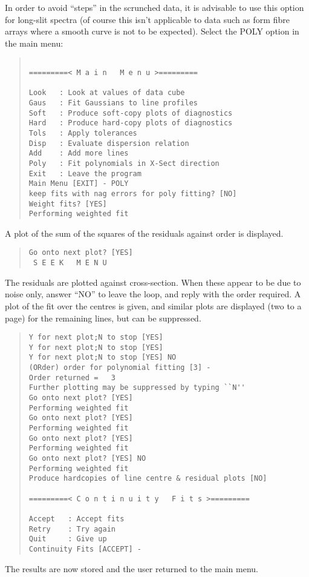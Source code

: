 In order to avoid ``steps'' in the scrunched data, it is advisable to
use this option for long-slit spectra (of course this isn't applicable
to data such as form fibre arrays where a smooth curve is not to be
expected).
Select the POLY option in the main menu:
\begin{quote}\begin{verbatim}

=========< M a i n   M e n u >=========

Look   : Look at values of data cube
Gaus   : Fit Gaussians to line profiles
Soft   : Produce soft-copy plots of diagnostics
Hard   : Produce hard-copy plots of diagnostics
Tols   : Apply tolerances
Disp   : Evaluate dispersion relation
Add    : Add more lines
Poly   : Fit polynomials in X-Sect direction
Exit   : Leave the program
Main Menu [EXIT] - POLY
keep fits with nag errors for poly fitting? [NO]
Weight fits? [YES]
Performing weighted fit
\end{verbatim}\end{quote}
A plot of the sum of the squares of the residuals against order is
displayed.
\begin{quote}\begin{verbatim}
Go onto next plot? [YES]
 S E E K   M E N U
\end{verbatim}\end{quote}
The residuals are plotted against cross-section. When these appear to
be due to noise only, answer ``NO'' to leave the loop, and reply with
the order required. A plot of the fit over the centres is given, and
similar plots are displayed (two to a page) for the remaining lines,
but can be suppressed.
\begin{quote}\begin{verbatim}
Y for next plot;N to stop [YES]
Y for next plot;N to stop [YES]
Y for next plot;N to stop [YES] NO
(ORder) order for polynomial fitting [3] -
Order returned =   3
Further plotting may be suppressed by typing ``N''
Go onto next plot? [YES]
Performing weighted fit
Go onto next plot? [YES]
Performing weighted fit
Go onto next plot? [YES]
Performing weighted fit
Go onto next plot? [YES] NO
Performing weighted fit
Produce hardcopies of line centre & residual plots [NO]

=========< C o n t i n u i t y   F i t s >=========

Accept   : Accept fits
Retry    : Try again
Quit     : Give up
Continuity Fits [ACCEPT] -
\end{verbatim}\end{quote}
The results are now stored and the user returned to the main menu.

